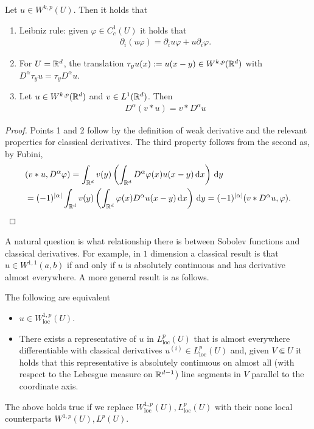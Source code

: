 \documentclass[
    a4paper,
    DIV=14,
    abstract=true,
    numbers=noenddot
]{scrartcl}
\begin{document}
\begin{proposition}[Properties]\label{properties}Let $u \in W^{k,p}(U)$. Then it holds that
	\begin{enumerate}

		\item Leibniz rule: given $\varphi \in C_c^1(U)$ it holds that
		      \begin{align*}
			      \partial _{i} (u \varphi)= \partial_i u \varphi+ u \partial _i \varphi .
		      \end{align*}

		\item For $U = \mathbb{R}^d$, the translation $\tau_y u(x):=u(x-y) \in W^{k,p}(\mathbb{R}^d)$ with $D^\alpha \tau_y u = \tau_y D^\alpha u$.
		\item  Let $u \in W^{k,p}(\mathbb{R}^d)$ and $v \in L^1(\mathbb{R}^d)$. Then
		      \begin{align*}
			      D^\alpha (v*u)= v* D^\alpha u
		      \end{align*}
	\end{enumerate}
\end{proposition}
\begin{proof}
	Points 1 and 2 follow by the definition of weak derivative and the relevant properties for classical derivatives. The third property follows from the second as, by Fubini,
	\begin{align*}
		 & (v*u,D^\alpha\varphi )  = \int_{\mathbb{R}^d}v(y)\left(\int_{\mathbb{R}^d}D^\alpha \varphi(x) u(x-y) \,\mathrm{d} x \right) \,\mathrm{d} y \\&
		=(-1)^{{\left| \alpha \right|} } \int_{\mathbb{R}^d}v(y)  \left(\int_{\mathbb{R}^d}\varphi(x) D^\alpha u(x-y) \,\mathrm{d} x \right) \,\mathrm{d} y             =(-1)^{{\left| \alpha \right|} }(v*D^\alpha u, \varphi).
	\end{align*}
\end{proof}
A natural question is what relationship there is between Sobolev functions and classical derivatives. For example, in $1$ dimension a classical result is that  $u \in W^{1,1}(a,b)$ if and only if $u$ is absolutely continuous and has derivative almost everywhere. A more general result is as follows.
\begin{proposition} The following are equivalent
	\begin{itemize}
		\item $u \in W^{1,p}_{\mathrm{loc}}(U)$.
		\item There exists a representative of $u$ in $L^p_{\mathrm{loc}}(U)$ that is almost everywhere differentiable with classical derivatives $u^{(i)} \in L^p_{\mathrm{loc}}(U)$ and, given $V \Subset U$ it holds that this representative is absolutely continuous on almost all (with respect to the Lebesgue measure on $\mathbb{R}^{d-1}$) line segments in $V$ parallel to the coordinate axis.
	\end{itemize}
	The above holds true if we replace $W^{1,p}_{\mathrm{loc}}(U),L^p_{\mathrm{loc}}(U)$ with their none local counterparts $W^{1,p}(U),L^p(U)$.
\end{proposition}
\end{document}
